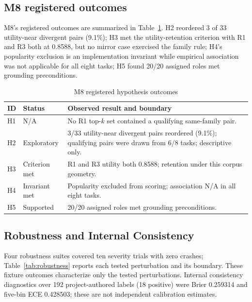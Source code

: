 \documentclass[conference]{IEEEtran}
\begin{document}
\subsection{M8 registered outcomes}
M8's registered outcomes are summarized in Table~\ref{tab:hypotheses}. H2 reordered 3 of 33 utility-near divergent pairs (9.1\%); H3 met the utility-retention criterion with R1 and R3 both at 0.8588, but no mirror case exercised the family rule; H4's popularity exclusion is an implementation invariant while empirical association was not applicable for all eight tasks; H5 found 20/20 assigned roles met grounding preconditions.

\begin{table}[t]
\caption{M8 registered hypothesis outcomes}
\label{tab:hypotheses}
\centering
\footnotesize
\begin{tabularx}{\columnwidth}{p{0.28in}p{0.75in}X}
\toprule
ID & Status & Observed result and boundary\\
\midrule
H1 & N/A & No R1 top-$k$ set contained a qualifying same-family pair.\\
H2 & Exploratory & 3/33 utility-near divergent pairs reordered (9.1\%); qualifying pairs were drawn from 6/8 tasks; descriptive only.\\
H3 & Criterion met & R1 and R3 utility both 0.8588; retention under this corpus geometry.\\
H4 & Invariant met & Popularity excluded from scoring; association N/A in all eight tasks.\\
H5 & Supported & 20/20 assigned roles met grounding preconditions.\\
\bottomrule
\end{tabularx}
\end{table}

\subsection{Robustness and Internal Consistency}
Four robustness suites covered ten severity trials with zero crashes; Table~\ref{tab:robustness} reports each tested perturbation and its boundary. These fixture outcomes characterize only the tested perturbations. Internal consistency diagnostics over 192 project-authored labels (18 positive) were Brier 0.259314 and five-bin ECE 0.428503; these are not independent calibration estimates.
\end{document}
